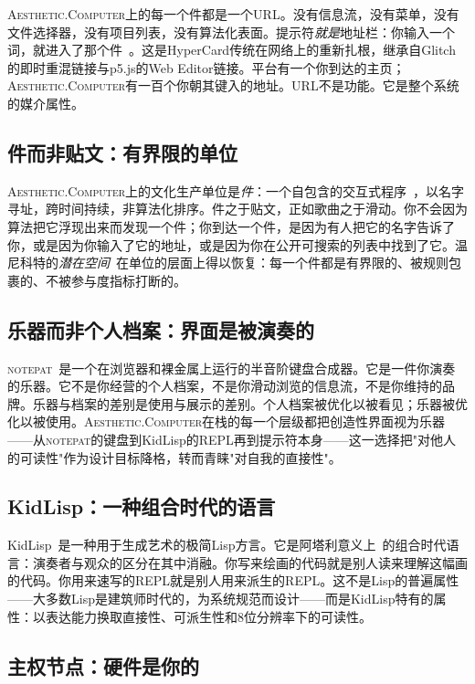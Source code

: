 \documentclass[10pt,letterpaper,twocolumn]{article}
\newcommand{\ac}{\textsc{Aesthetic.Computer}}
\newcommand{\np}{\textsc{notepat}}
\begin{document}
\ac{}上的每一个件都是一个URL。没有信息流，没有菜单，没有文件选择器，没有项目列表，没有算法化表面。提示符\emph{就是}地址栏：你输入一个词，就进入了那个件~\citep{scudder2026urltradition}。这是HyperCard传统在网络上的重新扎根，继承自Glitch的即时重混链接与p5.js的Web Editor链接。平台有一个你到达的主页；\ac{}有一百个你朝其键入的地址。URL不是功能。它是整个系统的媒介属性。

\subsection{件而非贴文：有界限的单位}

\ac{}上的文化生产单位是\emph{件}：一个自包含的交互式程序~\citep{scudder2026pieces}，以名字寻址，跨时间持续，非算法化排序。件之于贴文，正如歌曲之于滑动。你不会因为算法把它浮现出来而发现一个件；你到达一个件，是因为有人把它的名字告诉了你，或是因为你输入了它的地址，或是因为你在公开可搜索的列表中找到了它。温尼科特的\emph{潜在空间}~\citep{winnicott1971playing}在单位的层面上得以恢复：每一个件都是有界限的、被规则包裹的、不被参与度指标打断的。

\subsection{乐器而非个人档案：界面是被演奏的}

\np{}~\citep{scudder2026notepat}是一个在浏览器和裸金属上运行的半音阶键盘合成器。它是一件你演奏的乐器。它不是你经营的个人档案，不是你滑动浏览的信息流，不是你维持的品牌。乐器与档案的差别是使用与展示的差别。个人档案被优化以被看见；乐器被优化以被使用。\ac{}在栈的每一个层级都把创造性界面视为乐器——从\np{}的键盘到KidLisp的REPL再到提示符本身——这一选择把"对他人的可读性"作为设计目标降格，转而青睐"对自我的直接性"。

\subsection{KidLisp：一种组合时代的语言}

KidLisp~\citep{scudder2026kidlisp}是一种用于生成艺术的极简Lisp方言。它是阿塔利意义上~\citep{attali1985noise}的组合时代语言：演奏者与观众的区分在其中消融。你写来绘画的代码就是别人读来理解这幅画的代码。你用来速写的REPL就是别人用来派生的REPL。这不是Lisp的普遍属性——大多数Lisp是建筑师时代的，为系统规范而设计——而是KidLisp特有的属性：以表达能力换取直接性、可派生性和8位分辨率下的可读性。

\subsection{主权节点：硬件是你的}
\end{document}
